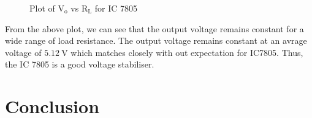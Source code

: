 \documentclass{scrartcl}
\begin{document}
\begin{figure}[H]
        \centering
        
        \caption{Plot of $\mathrm{V_o}$ vs $\mathrm{R_L}$ for IC 7805}
\end{figure}
\noindent
From the above plot, we can see that the output voltage remains constant for a wide range of load resistance. The output voltage remains constant at an avrage voltage of $5.12 \ \mathrm{V}$ which matches closely with out expectation for IC7805. Thus, the IC 7805 is a good voltage stabiliser.
\section{Conclusion}
\end{document}
